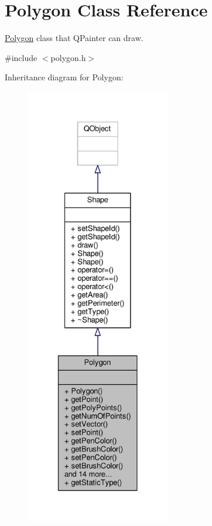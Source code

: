 \hypertarget{classPolygon}{}\section{Polygon Class Reference}
\label{classPolygon}


\hyperlink{classPolygon}{Polygon} class that Q\+Painter can draw.  




{\ttfamily \#include $<$polygon.\+h$>$}



Inheritance diagram for Polygon\+:\nopagebreak
\begin{figure}[H]
\begin{center}
\leavevmode
\includegraphics[height=550pt]{classPolygon__inherit__graph}
\end{center}
\end{figure}



